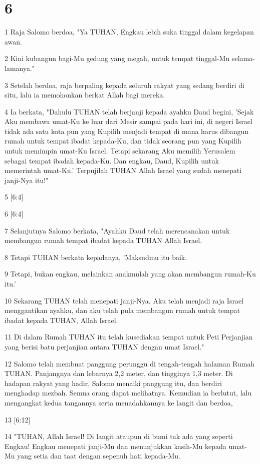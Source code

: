 \chapter{6}

\par 1 Raja Salomo berdoa, "Ya TUHAN, Engkau lebih suka tinggal dalam kegelapan awan.
\par 2 Kini kubangun bagi-Mu gedung yang megah, untuk tempat tinggal-Mu selama-lamanya."
\par 3 Setelah berdoa, raja berpaling kepada seluruh rakyat yang sedang berdiri di situ, lalu ia memohonkan berkat Allah bagi mereka.
\par 4 Ia berkata, "Dahulu TUHAN telah berjanji kepada ayahku Daud begini, 'Sejak Aku membawa umat-Ku ke luar dari Mesir sampai pada hari ini, di negeri Israel tidak ada satu kota pun yang Kupilih menjadi tempat di mana harus dibangun rumah untuk tempat ibadat kepada-Ku, dan tidak seorang pun yang Kupilih untuk memimpin umat-Ku Israel. Tetapi sekarang Aku memilih Yerusalem sebagai tempat ibadah kepada-Ku. Dan engkau, Daud, Kupilih untuk memerintah umat-Ku.' Terpujilah TUHAN Allah Israel yang sudah menepati janji-Nya itu!"
\par 5 [6:4]
\par 6 [6:4]
\par 7 Selanjutnya Salomo berkata, "Ayahku Daud telah merencanakan untuk membangun rumah tempat ibadat kepada TUHAN Allah Israel.
\par 8 Tetapi TUHAN berkata kepadanya, 'Maksudmu itu baik.
\par 9 Tetapi, bukan engkau, melainkan anakmulah yang akan membangun rumah-Ku itu.'
\par 10 Sekarang TUHAN telah menepati janji-Nya. Aku telah menjadi raja Israel menggantikan ayahku, dan aku telah pula membangun rumah untuk tempat ibadat kepada TUHAN, Allah Israel.
\par 11 Di dalam Rumah TUHAN itu telah kusediakan tempat untuk Peti Perjanjian yang berisi batu perjanjian antara TUHAN dengan umat Israel."
\par 12 Salomo telah membuat panggung perunggu di tengah-tengah halaman Rumah TUHAN. Panjangnya dan lebarnya 2,2 meter, dan tingginya 1,3 meter. Di hadapan rakyat yang hadir, Salomo menaiki panggung itu, dan berdiri menghadap mezbah. Semua orang dapat melihatnya. Kemudian ia berlutut, lalu mengangkat kedua tangannya serta menadahkannya ke langit dan berdoa,
\par 13 [6:12]
\par 14 "TUHAN, Allah Israel! Di langit ataupun di bumi tak ada yang seperti Engkau! Engkau menepati janji-Mu dan menunjukkan kasih-Mu kepada umat-Mu yang setia dan taat dengan sepenuh hati kepada-Mu.
